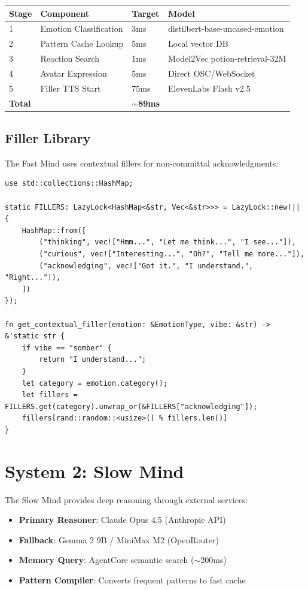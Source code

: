 \documentclass[11pt,letterpaper]{article}
\begin{document}
\begin{center}
\begin{tabular}{llll}
\toprule
\textbf{Stage} & \textbf{Component} & \textbf{Target} & \textbf{Model} \\
\midrule
1 & Emotion Classification & 3ms & distilbert-base-uncased-emotion \\
2 & Pattern Cache Lookup & 5ms & Local vector DB \\
3 & Reaction Search & 1ms & Model2Vec potion-retrieval-32M \\
4 & Avatar Expression & 5ms & Direct OSC/WebSocket \\
5 & Filler TTS Start & 75ms & ElevenLabs Flash v2.5 \\
\midrule
\textbf{Total} & & \textbf{$\sim$89ms} & \\
\bottomrule
\end{tabular}
\end{center}

\subsection{Filler Library}

The Fast Mind uses contextual fillers for non-committal acknowledgments:

\begin{lstlisting}[caption=Filler Selection]
use std::collections::HashMap;

static FILLERS: LazyLock<HashMap<&str, Vec<&str>>> = LazyLock::new(|| {
    HashMap::from([
        ("thinking", vec!["Hmm...", "Let me think...", "I see..."]),
        ("curious", vec!["Interesting...", "Oh?", "Tell me more..."]),
        ("acknowledging", vec!["Got it.", "I understand.", "Right..."]),
    ])
});

fn get_contextual_filler(emotion: &EmotionType, vibe: &str) -> &'static str {
    if vibe == "somber" {
        return "I understand...";
    }
    let category = emotion.category();
    let fillers = FILLERS.get(category).unwrap_or(&FILLERS["acknowledging"]);
    fillers[rand::random::<usize>() % fillers.len()]
}
\end{lstlisting}

\section{System 2: Slow Mind}

\begin{systembox}
The Slow Mind provides deep reasoning through external services:

\begin{itemize}
  \item \textbf{Primary Reasoner}: Claude Opus 4.5 (Anthropic API)
  \item \textbf{Fallback}: Gemma 2 9B / MiniMax M2 (OpenRouter)
  \item \textbf{Memory Query}: AgentCore semantic search ($\sim$200ms)
  \item \textbf{Pattern Compiler}: Converts frequent patterns to fast cache
\end{itemize}
\end{systembox}
\end{document}
